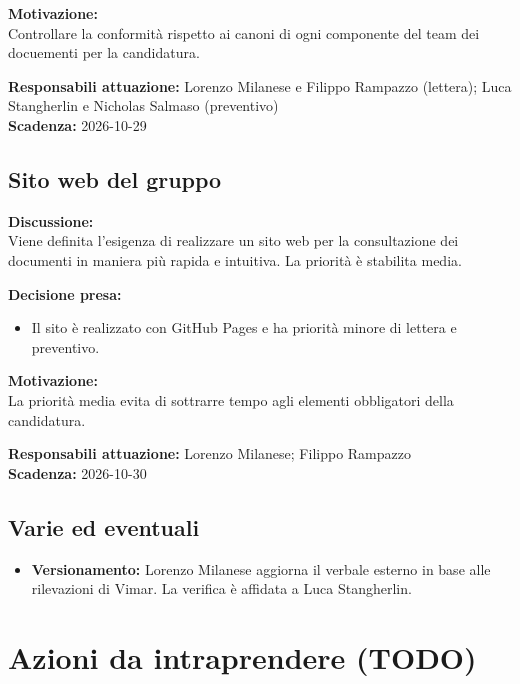 \documentclass[12pt,a4paper]{article}
\newcommand{\tightlist}{\setlength{\itemsep}{1pt}\setlength{\parskip}{0pt}}
\begin{document}
\textbf{Motivazione:} \\
Controllare la conformità rispetto ai canoni di ogni componente del team dei docuementi per la candidatura. 

\textbf{Responsabili attuazione:} Lorenzo Milanese e Filippo Rampazzo (lettera); Luca Stangherlin e Nicholas Salmaso (preventivo) \\
\textbf{Scadenza:} 2026-10-29

\hypertarget{argomento-5}{%
\subsection{Sito web del gruppo}}

\textbf{Discussione:} \\
Viene definita l'esigenza di realizzare un sito web per la consultazione dei documenti in maniera più rapida e intuitiva. La priorità è stabilita media.

\textbf{Decisione presa:}
\begin{itemize}
\tightlist
\item[$\checkmark$]  Il sito è realizzato con GitHub Pages e ha priorità minore di lettera e preventivo.
\end{itemize}

\textbf{Motivazione:} \\
 La priorità media evita di sottrarre tempo agli elementi obbligatori della candidatura.

\textbf{Responsabili attuazione:} Lorenzo Milanese; Filippo Rampazzo \\
\textbf{Scadenza:} 2026-10-30

\hypertarget{varie-ed-eventuali}{%
\subsection{Varie ed eventuali}}
\begin{itemize}
\tightlist
\item \textbf{Versionamento:} Lorenzo Milanese aggiorna il verbale esterno in base alle rilevazioni di Vimar. La verifica è affidata a Luca Stangherlin.
\end{itemize}

\hypertarget{azioni-da-intraprendere}{
\section{Azioni da intraprendere (TODO)}}
\end{document}
